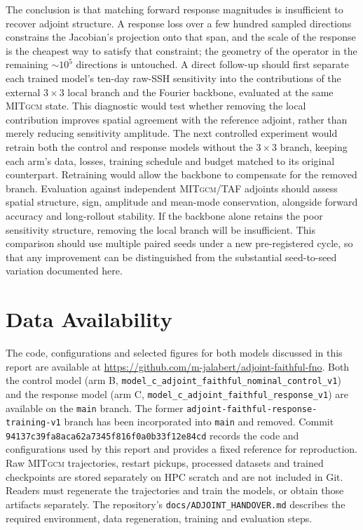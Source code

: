 \documentclass[3p,12pt]{elsarticle}
\newcommand{\MITgcm}{\textsc{MITgcm}}
\begin{document}
The conclusion is that matching forward response magnitudes is insufficient to
recover adjoint structure. A response loss over a few hundred sampled directions
constrains the Jacobian's projection onto that span, and the scale of the
response is the cheapest way to satisfy that constraint; the geometry of the
operator in the remaining $\sim10^{5}$ directions is untouched. A direct
follow-up should first separate each trained model's ten-day raw-SSH sensitivity
into the contributions of the external $3\times3$ local branch and the Fourier
backbone, evaluated at the same \MITgcm{} state. This diagnostic would test
whether removing the local contribution improves spatial agreement with the
reference adjoint, rather than merely reducing sensitivity amplitude. The next
controlled experiment would retrain both the control and response models without
the $3\times3$ branch, keeping each arm's data, losses, training schedule and
budget matched to its original counterpart. Retraining would allow the backbone
to compensate for the removed branch. Evaluation against independent
\MITgcm{}/TAF adjoints should assess spatial structure, sign, amplitude and
mean-mode conservation, alongside forward accuracy and long-rollout stability.
If the backbone alone retains the poor sensitivity structure, removing the local
branch will be insufficient. This comparison should use multiple paired seeds
under a new pre-registered cycle, so that any improvement can be distinguished
from the substantial seed-to-seed variation documented here.

\section*{Data Availability}
\label{sec:data-availability}

The code, configurations and selected figures for both models discussed in
this report are available at
\url{https://github.com/m-jalabert/adjoint-faithful-fno}. Both the control
model (arm B, \texttt{model\_c\_adjoint\_faithful\_nominal\_control\_v1}) and
the response model (arm C, \texttt{model\_c\_adjoint\_faithful\_response\_v1})
are available on the \texttt{main} branch. The former
\texttt{adjoint-faithful-response-training-v1} branch has been incorporated
into \texttt{main} and removed. Commit
\texttt{94137c39fa8aca62a7345f816f0a0b33f12e84cd} records the code and
configurations used by this report and provides a fixed reference for
reproduction. Raw \MITgcm{} trajectories, restart pickups, processed datasets
and trained checkpoints are stored separately on HPC scratch and are not
included in Git. Readers must regenerate the trajectories and train the
models, or obtain those artifacts separately. The repository's
\texttt{docs/ADJOINT\_HANDOVER.md} describes the required environment,
data regeneration, training and evaluation steps.
\end{document}
